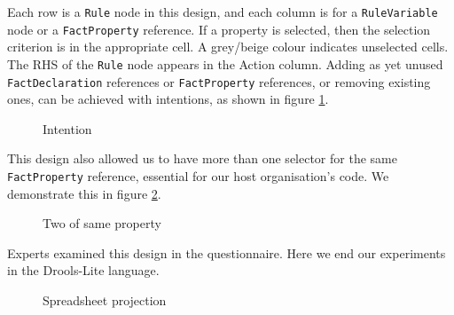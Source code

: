 Each row is a \texttt{Rule} node in this design, and each column is for a \texttt{RuleVariable} node or a \texttt{FactProperty} reference.
If a property is selected, then the selection criterion is in the appropriate cell.
A grey/beige colour indicates unselected cells.
The RHS of the \texttt{Rule} node appears in the Action column.
Adding as yet unused \texttt{FactDeclaration} references or \texttt{FactProperty} references, or removing existing ones, can be achieved with intentions, as shown in figure \ref{fig:SpreadsheetIntentions}.

\begin{figure}[h]
    \centering
    \caption{Intention}
    \label{fig:SpreadsheetIntentions}
\end{figure}

This design also allowed us to have more than one selector for the same \texttt{FactProperty} reference, essential for our host organisation's code.
We demonstrate this in figure \ref{fig:TwoProperties}.

\begin{figure}[h]
    \centering
    \caption{Two of same property}
    \label{fig:TwoProperties}
\end{figure}

Experts examined this design in the questionnaire. 
Here we end our experiments in the Drools-Lite language.

\begin{figure}
    \centering
    \caption{Spreadsheet projection}
    \label{fig:SpreadsheetProjection}
\end{figure}


